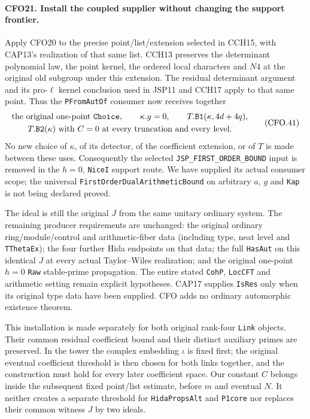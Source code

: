 \paragraph{CFO21. Install the coupled supplier without changing the support frontier.}
\label{claim:CFO21}
Apply CFO20 to the precise point/list/extension selected
in CCH15, with CAP13's realization of that same list.
CCH13 preserves the determinant polynomial law, the
point kernel, the ordered local characters and
$N4$ at the original old subgroup under this extension.
The residual determinant argument and its pro-$\ell$
kernel conclusion used in JSP11 and CCH17 apply to
that same point.  Thus the \texttt{PFromAutOf} consumer
now receives together
\[
 \begin{gathered}
 \text{the original one-point \texttt{Choice}},\qquad
 \kappa.g=0,\qquad
 T.\texttt{B1}(\kappa,4d+4q),\\
 T.\texttt{B2}(\kappa)\text{ with }C=0
       \text{ at every truncation and every level}.
 \end{gathered}                                                   \tag{CFO.41}
\]
No new choice of $\kappa$, of its detector, of the
coefficient extension, or of $T$ is made between these
uses.  Consequently the selected
\texttt{JSP\_FIRST\_ORDER\_BOUND} input is removed in the
$h=0$, \texttt{NiceI} support route.  We have supplied
its actual consumer scope; the universal
\texttt{FirstOrderDual}\allowbreak\texttt{ArithmeticBound} on arbitrary
$a$, $g$ and \texttt{Kap} is not being declared proved.

The ideal is still the original $J$ from the same
unitary ordinary system.  The remaining producer
requirements are unchanged: the original ordinary
ring/module/control and arithmetic-fiber data
(including type, neat level and \texttt{TThetaEx});
the four further Hida endpoints on that data; the
full \texttt{HasAut} on this identical $J$ at every
actual Taylor--Wiles realization; and the original
one-point $h=0$ \texttt{Raw} stable-prime propagation.
The entire stated \texttt{CohP}, \texttt{LocCFT}
and arithmetic setting remain explicit hypotheses.
CAP17 supplies \texttt{IsRes} only when its original
type data have been supplied.  CFO adds no ordinary
automorphic existence theorem.

This installation is made separately for both
original rank-four \texttt{Link} objects.  Their
common residual coefficient bound and their distinct
auxiliary primes are preserved.  In the tower the
complex embedding $\iota$ is fixed first; the
original eventual coefficient threshold is then
chosen for both links together, and the construction
must hold for every later coefficient space.  Our
constant $C$ belongs inside the subsequent fixed
point/list estimate, before $m$ and eventual $N$.
It neither creates a separate threshold for
\texttt{HidaPropsAlt} and \texttt{P1core} nor replaces
their common witness $J$ by two ideals.

